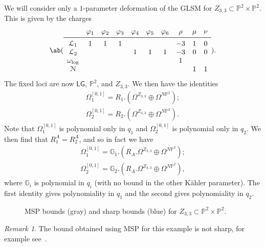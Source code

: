 \documentclass[10pt]{amsart}
\theoremstyle{definition}
\theoremstyle{remark}
\newtheorem{rmk}[thm]{Remark}
\theoremstyle{plain}
\theoremstyle{definition}
\theoremstyle{remark}
\newcommand{\G}{\mathbb{G}}
\renewcommand{\P}{\mathbb{P}}
\newcommand{\mc}[1]{\mathcal{#1}}
\newcommand{\ms}[1]{\mathsf{#1}}
\newcommand{\1}{\mathbf{1}}
\newcommand{\2}{\mathbf{2}}
\newcommand{\3}{\mathbf{3}}
\newcommand{\LG}{\ms{LG}}
\begin{document}
We will consider only a $1$-parameter deformation of the GLSM for $Z_{3,3} \subset \P^2 \times \P^2$. This is given by the charges
\[ \ab(\begin{array}{cccccccccc}
    & \varphi_1 & \varphi_2 & \varphi_3 & \varphi_4 & \varphi_5 & \varphi_6 & \rho & \mu & \nu \\
    \midrule
    \mc{L}_1 & 1 & 1 & 1 & & & & -3 & 1 & 0 \\
    \mc{L}_2 & & & & 1 & 1 & 1 & -3 & 0 & 0 \\
    \omega_{\log} & & & & & & & 1 & & \\
    \mc{N} & & & & & & & & 1 & 1
\end{array}). \]
The fixed loci are now $\LG$, $\P^2$, and $Z_{3,3}$. We then have the identities
\begin{align*}
    \Omega_1^{[0,1]} = R_1 . (\Omega^{Z_{3,3}} \oplus \Omega^{N\P^2}); \\ 
    \Omega_2^{[0,1]} = R_2 . (\Omega^{Z_{3,3}} \oplus \Omega^{N\P^2}). 
\end{align*}
Note that $\Omega_1^{[0,1]}$ is polynomial only in $q_1$ and $\Omega_2^{[0,1]}$ is polynomial only in $q_2$. We then find that $R_1^A = R_2^A$, and so in fact we have
\begin{align*}
    \Omega_1^{[0,1]} = \G_1 . (R_A. \Omega^{Z_{3,3}} \oplus \Omega^{N\P^2}); \\ 
    \Omega_2^{[0,1]} = \G_2 . (R_A .\Omega^{Z_{3,3}} \oplus \Omega^{N\P^2}), 
\end{align*}
where $\G_i$ is polynomial in $q_i$ (with no bound in the other K\"ahler parameter). The first identity gives polynomiality in $q_1$ and the second gives polynomiality in $q_2$.
    \begin{figure}[htpb]
    \begin{center}
    \end{center}
    \caption{MSP bounds (gray) and sharp bounds (blue) for $Z_{3,3} \subset \P^2 \times \P^2$.}%
    \label{fig:bounds}
    \end{figure}

\begin{rmk}
    The bound obtained using MSP for this example is not sharp, for example see~.
\end{rmk}

\printbibliography
\end{document}

